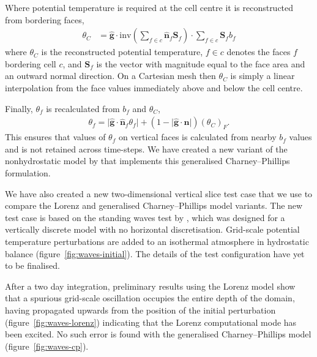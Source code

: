 \documentclass[a4paper,11pt]{article}
\begin{document}
Where potential temperature is required at the cell centre it is reconstructed from bordering faces,
\begin{align*}
	\theta_C &= \mathbf{\hat{g}} \cdot \mathrm{inv} \left( \sum_{f \in c} \mathbf{\hat{n}}_f \mathbf{S}_f \right) \cdot \sum_{f \in c} \mathbf{S}_f b_f
\end{align*}
where $\theta_C$ is the reconstructed potential temperature, $f \in c$ denotes the faces $f$ bordering cell $c$, and $\mathbf{S}_f$ is the vector with magnitude equal to the face area and an outward normal direction.  On a Cartesian mesh then $\theta_C$ is simply a linear interpolation from the face values immediately above and below the cell centre.

Finally, $\theta_f$ is recalculated from $b_f$ and $\theta_C$,
\begin{align*}
	\theta_f = \lvert \mathbf{\hat{g}} \cdot \mathbf{\hat{n}}_f \theta_f \rvert + \left( 1 - \lvert \mathbf{\hat{g}} \cdot \mathbf{\hat{n}} \rvert \right) \left( \theta_C \right)_F \text{.}
\end{align*}
This ensures that values of $\theta_f$ on vertical faces is calculated from nearby $b_f$ values and is not retained across time-steps.
We have created a new variant of the nonhydrostatic model by \citet{weller-shahrokhi2014} that implements this generalised Charney--Phillips formulation.

We have also created a new two-dimensional vertical slice test case that we use to compare the Lorenz and generalised Charney--Phillips model variants.
The new test case is based on the standing waves test by \citet{arakawa-konor1996}, which was designed for a vertically discrete model with no horizontal discretisation.
Grid-scale potential temperature perturbations are added to an isothermal atmosphere in hydrostatic balance (figure~\ref{fig:waves-initial}).  The details of the test configuration have yet to be finalised.

After a two day integration, preliminary results using the Lorenz model show that a spurious grid-scale oscillation occupies the entire depth of the domain, having propagated upwards from the position of the initial perturbation (figure~\ref{fig:waves-lorenz}) indicating that the Lorenz computational mode has been excited.  No such error is found with the generalised Charney--Phillips model (figure~\ref{fig:waves-cp}).
\end{document}
